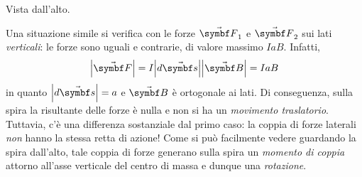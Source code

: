 \begin{center}
\begin{minipage}{0.49\textwidth}
\begin{center}
		\end{center}
		\begin{center}
		{\scriptsize Vista dall'alto.}
		\end{center}
	\end{minipage}
\end{center}
Una situazione simile si verifica con le forze $\vba{F}_{1}$ e $\vba{F}_2$ sui lati \textit{verticali}: le forze sono uguali e contrarie, di valore massimo $IaB$. Infatti,
	\begin{equation*}
		\abs{\vba{F}}=I\abs{d\vba{s}}\abs{\vba{B}}=IaB
	\end{equation*}
in quanto $\abs{d\vba{s}}=a$ e $\vba{B}$ è ortogonale ai lati. Di conseguenza, sulla spira la risultante delle forze è nulla e non si ha un \textit{movimento traslatorio}.\\
Tuttavia, c'è una differenza sostanziale dal primo caso: la coppia di forze laterali \textit{non} hanno la stessa retta di azione! Come si può facilmente vedere guardando la spira dall'alto, tale coppia di forze generano sulla spira un \textit{momento di coppia} attorno all'asse verticale del centro di massa e dunque una \textit{rotazione}.

